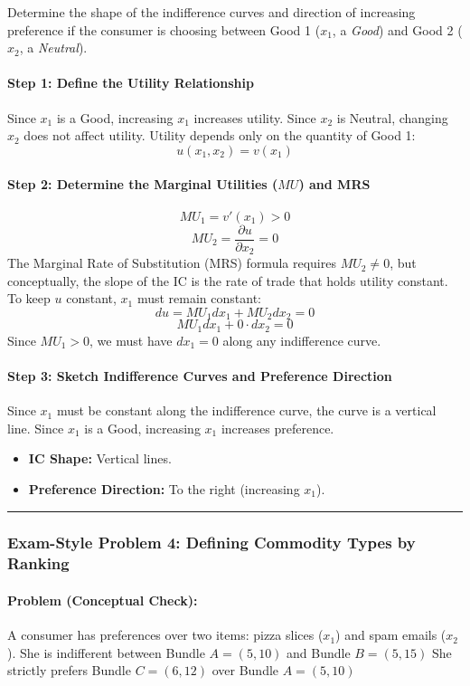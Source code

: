 \documentclass{article}
\begin{document}
Determine the shape of the indifference curves and direction of increasing preference if the consumer is choosing between Good 1 ($x_1$, a \textit{Good}) and Good 2 ($x_2$, a \textit{Neutral}).

\paragraph*{Step 1: Define the Utility Relationship}
Since $x_1$ is a Good, increasing $x_1$ increases utility. Since $x_2$ is Neutral, changing $x_2$ does not affect utility. Utility depends only on the quantity of Good 1:
$$u(x_1, x_2) = v(x_1)$$

\paragraph*{Step 2: Determine the Marginal Utilities ($MU$) and MRS}
$$MU_1 = v'(x_1) > 0$$
$$MU_2 = \frac{\partial u}{\partial x_2} = 0$$
The Marginal Rate of Substitution (MRS) formula requires $MU_2 \neq 0$, but conceptually, the slope of the IC is the rate of trade that holds utility constant. To keep $u$ constant, $x_1$ must remain constant:
$$du = MU_1 dx_1 + MU_2 dx_2 = 0$$
$$MU_1 dx_1 + 0 \cdot dx_2 = 0$$
Since $MU_1 > 0$, we must have $dx_1 = 0$ along any indifference curve.

\paragraph*{Step 3: Sketch Indifference Curves and Preference Direction}
Since $x_1$ must be constant along the indifference curve, the curve is a vertical line. Since $x_1$ is a Good, increasing $x_1$ increases preference.

\begin{itemize}
    \item \textbf{IC Shape:} Vertical lines.
    \item \textbf{Preference Direction:} To the right (increasing $x_1$).
\end{itemize}

\noindent\rule{\linewidth}{0.4pt}

\subsubsection*{Exam-Style Problem 4: Defining Commodity Types by Ranking}

\paragraph*{Problem (Conceptual Check):}
A consumer has preferences over two items: pizza slices ($x_1$) and spam emails ($x_2$). She is indifferent between Bundle $A=(5, 10)$ and Bundle $B=(5, 15)$ She strictly prefers Bundle $C=(6, 12)$ over Bundle $A=(5, 10)$
\end{document}

